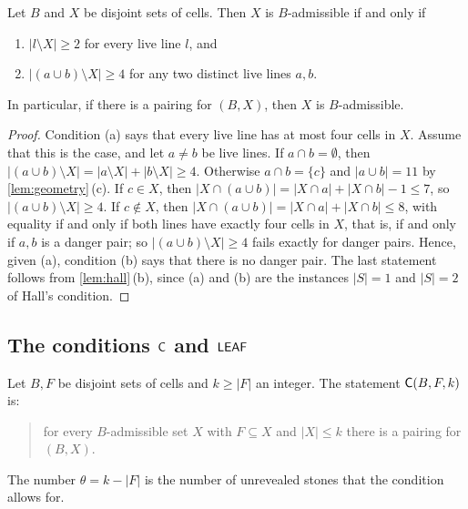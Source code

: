 \begin{lemma}\label{lem:one-two}
Let $B$ and $X$ be disjoint sets of cells. Then $X$ is $B$-admissible if and only if
\begin{enumerate}[label=\textup{(\alph*)}]
\item $|l\setminus X|\ge 2$ for every live line $l$, and
\item $|(a\cup b)\setminus X|\ge 4$ for any two distinct live lines $a,b$.
\end{enumerate}
In particular, if there is a pairing for $(B,X)$, then $X$ is $B$-admissible.
\end{lemma}

\begin{proof}
Condition (a) says that every live line has at most four cells in $X$. Assume that this is the case, and
let $a\ne b$ be live lines. If $a\cap b=\emptyset$, then $|(a\cup b)\setminus X|=|a\setminus X|+|b\setminus
X|\ge 4$. Otherwise $a\cap b=\{c\}$ and $|a\cup b|=11$ by \cref{lem:geometry}\,(c). If $c\in X$, then
$|X\cap(a\cup b)|=|X\cap a|+|X\cap b|-1\le 7$, so $|(a\cup b)\setminus X|\ge 4$. If $c\notin X$, then
$|X\cap(a\cup b)|=|X\cap a|+|X\cap b|\le 8$, with equality if and only if both lines have exactly four
cells in $X$, that is, if and only if $a,b$ is a danger pair; so $|(a\cup b)\setminus X|\ge 4$ fails
exactly for danger pairs. Hence, given (a), condition (b) says that there is no danger pair. The last
statement follows from \cref{lem:hall}\,(b), since (a) and (b) are the instances $|S|=1$ and $|S|=2$ of
Hall's condition.
\end{proof}

\subsection{The conditions \texorpdfstring{$\mathsf{C}$}{C} and \texorpdfstring{$\mathsf{LEAF}$}{LEAF}}\label{ssec:certs}

\begin{definition}\label{def:C}
Let $B,F$ be disjoint sets of cells and $k\ge|F|$ an integer. The statement $\mathsf{C}(B,F,k)$ is:
\begin{quote}
for every $B$-admissible set $X$ with $F\subseteq X$ and $|X|\le k$ there is a pairing for $(B,X)$.
\end{quote}
The number $\theta=k-|F|$ is the number of unrevealed stones that the condition allows for.
\end{definition}

